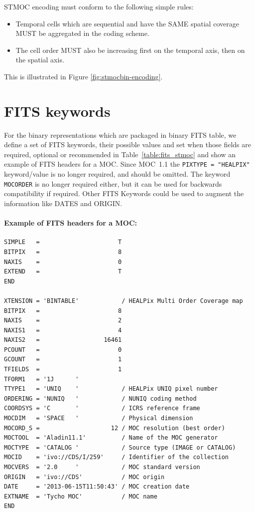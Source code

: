 \documentclass[11pt,a4paper]{ivoa}
\begin{document}
STMOC encoding must conform to the following simple rules:
\begin{itemize}
\item{Temporal cells which are sequential and have the SAME
  spatial coverage MUST be aggregated in the coding scheme.}
\item{The cell order MUST also be increasing first on the
  temporal axis, then on the spatial axis.}
\end{itemize}
This is illustrated in Figure \ref{fig:stmocbin-encoding}.


\section{FITS keywords}
\label{sec:fits-key-moc} 
For the binary representations which are packaged in binary FITS table,
we define a set of FITS keywords, their possible values and set when
those fields are required, optional or recommended in
Table~\ref{table:fits_stmoc} and show an example of FITS headers for a MOC.
Since MOC~1.1 \citep{2019ivoa.spec.1007F} the {\tt PIXTYPE = "HEALPIX"}
keyword/value is no longer required, and should be omitted. 
The keyword {\tt MOCORDER} is no longer required either, but it can be used for
backwards compatibility if required.
Other FITS Keywords could be used to augment the information like DATES and ORIGIN. 
 

 
\paragraph{Example of FITS headers for a MOC:}
\par\noindent
\begin{lstlisting}[basicstyle=\footnotesize\ttfamily]
SIMPLE   =                      T
BITPIX   =                      8
NAXIS    =                      0
EXTEND   =                      T
END
    
XTENSION = 'BINTABLE'            / HEALPix Multi Order Coverage map
BITPIX   =                      8
NAXIS    =                      2
NAXIS1   =                      4
NAXIS2   =                  16461
PCOUNT   =                      0
GCOUNT   =                      1
TFIELDS  =                      1
TFORM1   = '1J      '
TTYPE1   = 'UNIQ    '            / HEALPix UNIQ pixel number
ORDERING = 'NUNIQ   '            / NUNIQ coding method
COORDSYS = 'C       '            / ICRS reference frame
MOCDIM   = 'SPACE   '            / Physical dimension
MOCORD_S =                    12 / MOC resolution (best order)
MOCTOOL  = 'Aladin11.1'          / Name of the MOC generator
MOCTYPE  = 'CATALOG '            / Source type (IMAGE or CATALOG)
MOCID    = 'ivo://CDS/I/259'     / Identifier of the collection
MOCVERS  = '2.0     '            / MOC standard version
ORIGIN   = 'ivo://CDS'           / MOC origin
DATE     = '2013-06-15T11:50:43' / MOC creation date
EXTNAME  = 'Tycho MOC'           / MOC name
END
\end{lstlisting}
\end{document}
